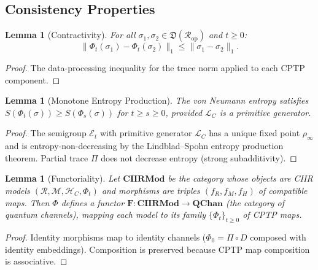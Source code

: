 \documentclass[11pt,a4paper]{article}
\newtheorem{lemma}[definition]{Lemma}
\theoremstyle{remark}
\newcommand{\CR}{\mathcal{R}}
\newcommand{\CM}{\mathcal{M}}
\newcommand{\HC}{\mathcal{H}_C}
\newcommand{\CL}{\mathcal{L}}
\begin{document}
\subsection{Consistency Properties}

\begin{lemma}[Contractivity]
\label{lem:contract}
For all $\sigma_1, \sigma_2 \in \mathfrak{D}(\CR_{\mathrm{op}})$ and
$t \geq 0$:
\[
  \|\Phi_t(\sigma_1) - \Phi_t(\sigma_2)\|_1
  \leq
  \|\sigma_1 - \sigma_2\|_1.
\]
\end{lemma}

\begin{proof}
The data-processing inequality for the trace norm applied to each CPTP
component.
\end{proof}

\begin{lemma}[Monotone Entropy Production]
\label{lem:entropy}
The von Neumann entropy satisfies
$S(\Phi_t(\sigma)) \geq S(\Phi_s(\sigma))$ for $t \geq s \geq 0$,
provided $\CL_C$ is a primitive generator.
\end{lemma}

\begin{proof}
The semigroup $\mathcal{E}_t$ with primitive generator $\CL_C$ has a
unique fixed point $\rho_\infty$ and is entropy-non-decreasing by the
Lindblad--Spohn entropy production theorem.  Partial trace $\Pi$ does
not decrease entropy (strong subadditivity).
\end{proof}

\begin{lemma}[Functoriality]
\label{lem:functor}
Let $\mathbf{CIIRMod}$ be the category whose objects are CIIR models
$(\CR, \CM, \HC, \Phi_t)$ and morphisms are triples
$(f_R, f_M, f_H)$ of compatible maps.  Then $\Phi$ defines a functor
$\mathbf{F}: \mathbf{CIIRMod} \to \mathbf{QChan}$ (the category of
quantum channels), mapping each model to its family
$\{\Phi_t\}_{t \geq 0}$ of CPTP maps.
\end{lemma}

\begin{proof}
Identity morphisms map to identity channels ($\Phi_0 = \Pi \circ D$
composed with identity embeddings).  Composition is preserved because
CPTP map composition is associative.
\end{proof}

\bigskip
\noindent{}
\end{document}
